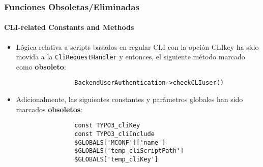 
\begin{frame}[fragile]
	\frametitle{Funciones Obsoletas/Eliminadas}
	\framesubtitle{CLI-related Constants and Methods}


	\begin{itemize}

		\item Lógica relativa a scripts basados en regular CLI con la opción CLIkey ha sido movida
			a la \texttt{CliRequestHandler} y entonces, el siguiente método marcado como
			 \textbf{obsoleto}:

			\begin{lstlisting}
				BackendUserAuthentication->checkCLIuser()
			\end{lstlisting}

		\item Adicionalmente, las siguientes constantes y parámetros globales han sido marcados
			 \textbf{obsoletos}:

			\begin{lstlisting}
				const TYPO3_cliKey
				const TYPO3_cliInclude
				$GLOBALS['MCONF']['name']
				$GLOBALS['temp_cliScriptPath']
				$GLOBALS['temp_cliKey']
			\end{lstlisting}

	\end{itemize}

\end{frame}


